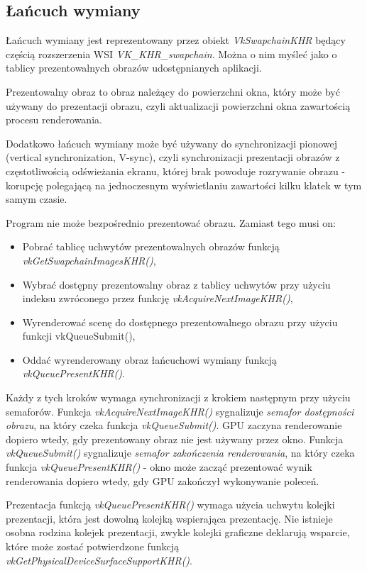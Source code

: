 \subsection{Łańcuch wymiany}

Łańcuch wymiany jest reprezentowany przez obiekt \textit{VkSwapchainKHR} będący częścią rozszerzenia WSI \textit{VK\_KHR\_swapchain}. Można o nim myśleć jako o tablicy prezentowalnych obrazów udostępnianych aplikacji.

Prezentowalny obraz to obraz należący do powierzchni okna, który może być używany do prezentacji obrazu, czyli aktualizacji powierzchni okna zawartością procesu renderowania.

Dodatkowo łańcuch wymiany może być używany do synchronizacji pionowej (vertical synchronization, V-sync), czyli synchronizacji prezentacji obrazów z częstotliwością
odświeżania ekranu, której brak powoduje rozrywanie obrazu - korupcję polegającą na jednoczesnym wyświetlaniu zawartości
kilku klatek w tym samym czasie.

Program nie może bezpośrednio prezentować obrazu. Zamiast tego musi on:
\begin{itemize}
	\item Pobrać tablicę uchwytów prezentowalnych obrazów funkcją \textit{vkGetSwapchainImagesKHR()},
	\item Wybrać dostępny prezentowalny obraz z tablicy uchwytów przy użyciu indeksu zwróconego przez funkcję \textit{vkAcquireNextImageKHR()},
	\item Wyrenderować scenę do dostępnego prezentowalnego obrazu przy użyciu funkcji vkQueueSubmit(),
	\item Oddać wyrenderowany obraz łańcuchowi wymiany funkcją \textit{vkQueuePresentKHR()}.
\end{itemize}
Każdy z tych kroków wymaga synchronizacji z krokiem następnym przy użyciu semaforów. Funkcja \textit{vkAcquireNextImageKHR()} sygnalizuje \textit{semafor dostępności obrazu}, na który czeka funkcja \textit{vkQueueSubmit()}. GPU zaczyna renderowanie dopiero wtedy, gdy prezentowany obraz nie jest używany przez okno.
Funkcja \textit{vkQueueSubmit()} sygnalizuje \textit{semafor zakończenia renderowania}, na który czeka funkcja \textit{vkQueuePresentKHR()} - okno może zacząć prezentować wynik renderowania dopiero wtedy, gdy GPU zakończył wykonywanie poleceń.

Prezentacja funkcją \textit{vkQueuePresentKHR()} wymaga użycia uchwytu kolejki prezentacji, która jest dowolną kolejką wspierająca prezentację.
Nie istnieje osobna rodzina kolejek prezentacji, zwykle kolejki graficzne deklarują wsparcie, które może zostać potwierdzone funkcją \textit{vkGetPhysicalDeviceSurfaceSupportKHR()}.

